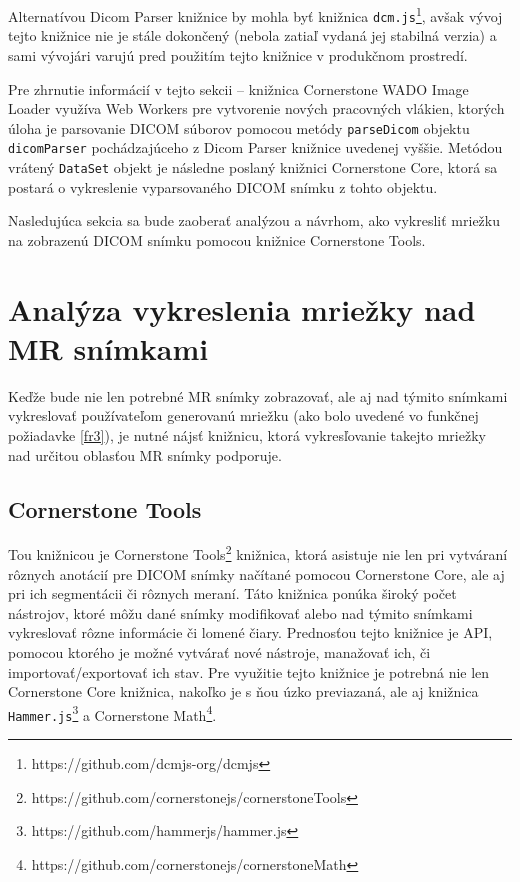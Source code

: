 Alternatívou Dicom Parser knižnice by mohla byť knižnica \texttt{dcm.js}\footnote{https://github.com/dcmjs-org/dcmjs}, avšak vývoj tejto knižnice nie je stále dokončený (nebola zatiaľ vydaná jej stabilná verzia) a sami vývojári varujú pred použitím tejto knižnice v produkčnom prostredí. 

Pre zhrnutie informácií v tejto sekcii -- knižnica Cornerstone WADO Image Loader využíva Web Workers pre vytvorenie nových pracovných vlákien, ktorých úloha je parsovanie DICOM súborov pomocou metódy \texttt{parseDicom} objektu \texttt{dicomParser} pochádzajúceho z Dicom Parser knižnice uvedenej vyššie. Metódou vrátený \texttt{DataSet} objekt je následne poslaný knižnici Cornerstone Core, ktorá sa postará o vykreslenie vyparsovaného DICOM snímku z tohto objektu.

Nasledujúca sekcia sa bude zaoberať analýzou a návrhom, ako vykresliť mriežku na zobrazenú DICOM snímku pomocou knižnice Cornerstone Tools.

\section {Analýza vykreslenia mriežky nad MR snímkami}
Keďže bude nie len potrebné MR snímky zobrazovať, ale aj nad týmito snímkami vykreslovať používateľom generovanú mriežku (ako bolo uvedené vo funkčnej požiadavke \ref{fr3}), je nutné nájsť knižnicu, ktorá vykresľovanie takejto mriežky nad určitou oblasťou MR snímky podporuje.

\subsection {Cornerstone Tools}
Tou knižnicou je Cornerstone Tools\footnote{https://github.com/cornerstonejs/cornerstoneTools} knižnica, ktorá asistuje nie len pri vytváraní rôznych anotácií pre DICOM snímky načítané pomocou Cornerstone Core, ale aj pri ich segmentácii či rôznych meraní. Táto knižnica ponúka široký počet nástrojov, ktoré môžu dané snímky modifikovať alebo nad týmito snímkami vykreslovať rôzne informácie či lomené čiary.
Prednosťou tejto knižnice je API, pomocou ktorého je možné vytvárať nové nástroje, manažovať ich, či importovať/exportovať ich stav. Pre využitie tejto knižnice je potrebná nie len Cornerstone Core knižnica, nakoľko je s ňou úzko previazaná, ale aj knižnica \texttt{Hammer.js}\footnote{https://github.com/hammerjs/hammer.js} a Cornerstone Math\footnote{https://github.com/cornerstonejs/cornerstoneMath}.

